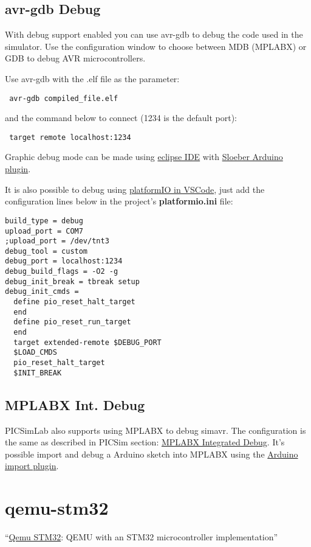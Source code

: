 \subsection{avr-gdb Debug} \hypertarget{def:gdbavr}{}
 
 With debug support enabled you can use avr-gdb to debug the code used in the simulator. 
 Use the configuration window to choose between MDB (MPLABX) or GDB to debug AVR microcontrollers. 
 
 
 Use avr-gdb with the .elf file as the parameter:
 \begin{verbatim}
 avr-gdb compiled_file.elf
 \end{verbatim}
 and the command below to connect (1234 is the default port):
 \begin{verbatim}
 target remote localhost:1234
 \end{verbatim}

Graphic debug mode can be made using \href{https://www.eclipse.org/}{eclipse IDE} with \href{https://eclipse.baeyens.it/}{Sloeber Arduino plugin}.

It is also possible to debug using \href{https://platformio.org/}{platformIO in VSCode}, just add the configuration lines below in the project's \textbf{platformio.ini} file:
\begin{verbatim}
build_type = debug
upload_port = COM7
;upload_port = /dev/tnt3
debug_tool = custom
debug_port = localhost:1234
debug_build_flags = -O2 -g
debug_init_break = tbreak setup
debug_init_cmds =
  define pio_reset_halt_target
  end
  define pio_reset_run_target
  end
  target extended-remote $DEBUG_PORT
  $LOAD_CMDS
  pio_reset_halt_target
  $INIT_BREAK
\end{verbatim}

\subsection{MPLABX Int. Debug }
PICSimLab also supports using MPLABX to debug simavr. The configuration is the same as described in PICSim section: \hyperlink{def:mplabxd}{MPLABX Integrated Debug}. 
It's possible import and debug a Arduino sketch into MPLABX using the \href{https://github.com/janegilruud/chipKIT-importer-2.0}{Arduino import plugin}.

 \section{qemu-stm32} \hypertarget{def:qemu-stm32}{}
 ``\href{http://beckus.github.io/qemu_stm32/}{Qemu STM32}: QEMU with an STM32 microcontroller implementation''
 
